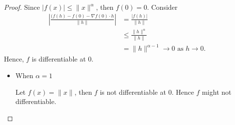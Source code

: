 \begin{Exercise}
\begin{proof}
Since $|f(x)| \leq \|x\|^{\alpha}$, then $f(0) = 0$.
Consider
\begin{align*}
\left| \frac{(f(h)-f(0)-\nabla f(0)\cdot h}{\| h \|} \right|
&= \frac{|f(h)|}{\| h \|} \\
&\leq \frac{\| h \|^{\alpha}}{\| h \|} \\
&= \| h \|^{\alpha-1} \to 0 \text{ as } h\to 0.
\end{align*}
Hence, $f$ is differentiable at $0$.

\begin{itemize}
\item When $\alpha = 1$

Let $f(x) = \| x \|$, then $f$ is not differentiable at $0$. Hence $f$ might not differentiable.
\end{itemize}


\end{proof}
\end{Exercise}